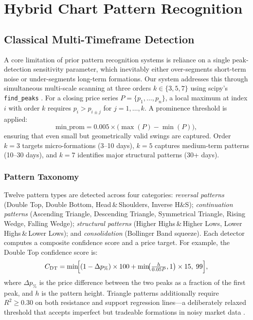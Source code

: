 \documentclass[ASNA,twocolumn]{USG}
\begin{document}
\section{Hybrid Chart Pattern Recognition}\label{sec:pattern}

\subsection{Classical Multi-Timeframe Detection}

A core limitation of prior pattern recognition systems is reliance on a single
peak-detection sensitivity parameter, which inevitably either over-segments
short-term noise or under-segments long-term formations.
Our system addresses this through simultaneous multi-scale scanning at three
orders $k \in \{3, 5, 7\}$ using scipy's \texttt{find\_peaks} \citep{scipy2020}.
For a closing price series $P = \{p_1, \ldots, p_n\}$, a local maximum
at index $i$ with order $k$ requires $p_i > p_{i\pm j}$ for $j = 1, \ldots, k$.
A prominence threshold is applied:
\begin{equation}
  \text{min\_prom} = 0.005 \times \bigl(\max(P) - \min(P)\bigr),
  \label{eq:prominence}
\end{equation}
ensuring that even small but geometrically valid swings are captured.
Order $k = 3$ targets micro-formations (3--10 days), $k = 5$ captures
medium-term patterns (10--30 days), and $k = 7$ identifies major
structural patterns (30+ days).

\subsubsection{Pattern Taxonomy}

Twelve pattern types are detected across four categories:
\emph{reversal patterns} (Double Top, Double Bottom, Head\,\&\,Shoulders,
Inverse H\&S); \emph{continuation patterns} (Ascending Triangle, Descending
Triangle, Symmetrical Triangle, Rising Wedge, Falling Wedge);
\emph{structural patterns} (Higher Highs\,\&\,Higher Lows, Lower
Highs\,\&\,Lower Lows); and \emph{consolidation} (Bollinger Band squeeze).
Each detector computes a composite confidence score and a price target.
For example, the Double Top confidence score is:
\begin{equation}
  C_\text{DT} = \min\!\Bigl[(1-\Delta p_\%)\times 100
    + \min\!\bigl(\tfrac{h}{0.05P},1\bigr)\times 15,\; 99\Bigr],
  \label{eq:dtconf}
\end{equation}
where $\Delta p_\%$ is the price difference between the two peaks as a
fraction of the first peak, and $h$ is the pattern height. Triangle patterns
additionally require $R^2 \geq 0.30$ on both resistance and support regression
lines---a deliberately relaxed threshold that accepts imperfect but tradeable
formations in noisy market data \citep{bollinger2002}.
\end{document}
